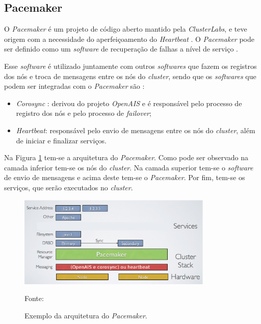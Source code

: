 
\subsection{Pacemaker}
\label{section:pacemaker}
O \textit{Pacemaker} \cite{pacemaker} é um projeto de código aberto mantido pela \textit{ClusterLabs}, e teve origem com a necessidade do 
aperfeiçoamento do \textit{Heartbeat} \cite{heartbeat}. 
O \textit{Pacemaker} pode ser definido como um \textit{software} de recuperação de falhas a nível de serviço \cite{perkov2011}. 

Esse \textit{software} é utilizado juntamente com outros \textit{softwares} que fazem os registros dos nós e troca de mensagens entre os nós do 
\textit{cluster}, sendo que os \textit{softwares} que podem ser integradas com o \textit{Pacemaker} são \cite{pacemaker}:
\begin{itemize}
 \item \textit{Corosync} \cite{corosync}: derivou do projeto \textit{OpenAIS} e é responsável pelo processo de registro dos nós e pelo processo 
 de \textit{failover};
 \item \textit{Heartbeat}: responsável pelo envio de mensagens entre os nós do \textit{cluster}, além de iniciar e finalizar serviços.
\end{itemize}


Na Figura \ref{fig:pacemaker_tools} tem-se a arquitetura do \textit{Pacemaker}. Como pode ser observado na camada inferior tem-se os nós do 
\textit{cluster}. Na camada superior tem-se o \textit{software} de envio de mensagens e acima deste tem-se o \textit{Pacemaker}. 
Por fim, tem-se os serviços, que serão executados no \textit{cluster}.

\begin{figure}[h!]
 \centering
 \includegraphics[width=350px]{img/pacemaker_tools.eps}
 \caption{Exemplo da arquitetura do \textit{Pacemaker}.}
 Fonte: \citet{pacemaker}
 \label{fig:pacemaker_tools}
\end{figure}

